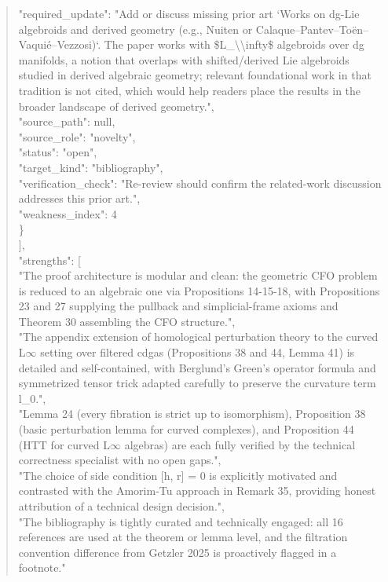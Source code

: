 \documentclass[11pt]{article}
\begin{document}
\begin{quote}
      "required\_update": "Add or discuss missing prior art `Works on dg-Lie algebroids and derived geometry (e.g., Nuiten or Calaque--Pantev--Toën--Vaquié--Vezzosi)`. The paper works with \$L\_\textbackslash{}\textbackslash{}infty\$ algebroids over dg manifolds, a notion that overlaps with shifted/derived Lie algebroids studied in derived algebraic geometry; relevant foundational work in that tradition is not cited, which would help readers place the results in the broader landscape of derived geometry.",\\
      "source\_path": null,\\
      "source\_role": "novelty",\\
      "status": "open",\\
      "target\_kind": "bibliography",\\
      "verification\_check": "Re-review should confirm the related-work discussion addresses this prior art.",\\
      "weakness\_index": 4\\
    \}\\
  ],\\
  "strengths": [\\
    "The proof architecture is modular and clean: the geometric CFO problem is reduced to an algebraic one via Propositions 14-15-18, with Propositions 23 and 27 supplying the pullback and simplicial-frame axioms and Theorem 30 assembling the CFO structure.",\\
    "The appendix extension of homological perturbation theory to the curved L\ensuremath{\infty} setting over filtered cdgas (Propositions 38 and 44, Lemma 41) is detailed and self-contained, with Berglund's Green's operator formula and symmetrized tensor trick adapted carefully to preserve the curvature term l\_0.",\\
    "Lemma 24 (every fibration is strict up to isomorphism), Proposition 38 (basic perturbation lemma for curved complexes), and Proposition 44 (HTT for curved L\ensuremath{\infty} algebras) are each fully verified by the technical correctness specialist with no open gaps.",\\
    "The choice of side condition [h, r] = 0 is explicitly motivated and contrasted with the Amorim-Tu approach in Remark 35, providing honest attribution of a technical design decision.",\\
    "The bibliography is tightly curated and technically engaged: all 16 references are used at the theorem or lemma level, and the filtration convention difference from Getzler 2025 is proactively flagged in a footnote."\\

\end{quote}
\end{document}

